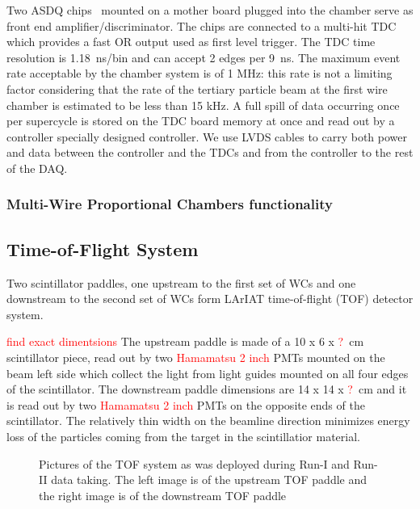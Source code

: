 Two ASDQ chips~\cite{ASDQchip} mounted on a mother board plugged into the chamber serve as front end amplifier/discriminator. The chips are connected to a multi-hit TDC~\cite{Sten} which provides a fast OR output used as first level trigger. The TDC time resolution is 1.18~ns/bin and can accept 2 edges per 9~ns.  
The maximum event rate acceptable by the chamber system is of 1 MHz: this rate is not a limiting factor considering that the rate of the tertiary particle beam at the first wire chamber is estimated to be less than 15 kHz. A full spill of data occurring once per supercycle is stored on the TDC board memory at once and read out by a controller specially designed controller.  We use LVDS cables to carry both power and data between the controller and the TDCs and from the controller to the rest of the DAQ.  

\subsubsection{Multi-Wire Proportional Chambers functionality}\label{sec:MWPCfunc}


\subsection{Time-of-Flight System}\label{sec:TOF}
Two scintillator paddles, one upstream to the first set of WCs and one downstream to the second set of WCs  form LArIAT  time-of-flight (TOF) detector system. 

 \textcolor{red}{find exact dimentsions}
The upstream paddle is made of a 10 x 6 x \textcolor{red}{?}~cm scintillator piece, read out by two \textcolor{red}{Hamamatsu 2 inch} PMTs mounted on the beam left side which collect the light from light guides mounted on all four edges of the scintillator. The downstream paddle dimensions are  14 x 14 x \textcolor{red}{?}~cm and it is read out by two \textcolor{red}{Hamamatsu 2 inch} PMTs on the opposite ends of the scintillator.
The relatively thin width on the beamline direction minimizes energy loss of the particles coming from the target in the scintillatior material.

\begin{figure}[!h]
\begin{centering}
\vspace{-0.3cm}
\caption{
{\scriptsize \sf Pictures of the TOF system as was deployed during Run-I and Run-II data taking. The left image is of the upstream TOF paddle and the right image is of the downstream TOF paddle }
}
\label{fig:TOFSystemRunIandII}
\end{centering}
\end{figure}



